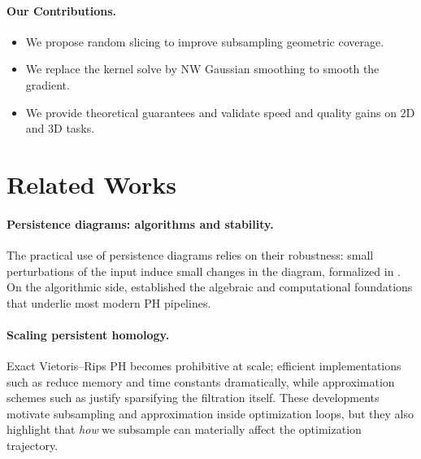 \documentclass{article} %
\theoremstyle{plain}
\theoremstyle{definition}
\theoremstyle{remark}
\begin{document}
\paragraph{Our Contributions.}
\begin{itemize}
    \item We propose random slicing to improve subsampling geometric coverage.
    \item We replace the kernel solve by NW Gaussian smoothing to smooth the gradient.
    \item We provide theoretical guarantees and validate speed and quality gains on $2$D and $3$D tasks.
\end{itemize}

\section{Related Works}
\paragraph{Persistence diagrams: algorithms and stability.}
The practical use of persistence diagrams relies on their robustness: small perturbations of the input induce small changes in the diagram, formalized in \cite{cohensteiner2007stability}. On the algorithmic side, \cite{zomorodian2005computing, Edelsbrunner2002} established the algebraic and computational foundations that underlie most modern PH pipelines.

\paragraph{Scaling persistent homology.}
Exact Vietoris--Rips PH becomes prohibitive at scale; efficient implementations such as \cite{bauer2021ripser} reduce memory and time constants dramatically, while approximation schemes such as \cite{sheehy2013linear} justify sparsifying the filtration itself. These developments motivate subsampling and approximation inside optimization loops, but they also highlight that \emph{how} we subsample can materially affect the optimization trajectory.
\end{document}
